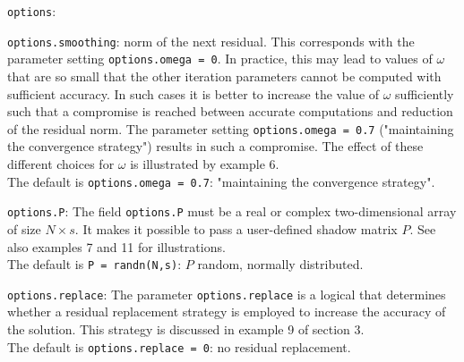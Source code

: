 \documentclass[prodmode,acmtoms]{acmsmall}
\begin{document}
\begin{describe}{{\tt options}:}
\begin{describe}{{\tt options.smoothing}:}
norm of the next residual. This corresponds with the parameter setting {\tt options.omega = 0}. In practice, this may lead to values of $\omega$ that are so small that the other iteration parameters cannot be computed with 
sufficient accuracy. In such cases it is better to increase the value  
of $\omega$ sufficiently such that a compromise is reached between accurate computations and reduction of the 
residual norm. The parameter setting {\tt options.omega = 0.7} ("maintaining the convergence strategy") results 
in  such a compromise. The effect of these different choices for $\omega$ is illustrated by example 6.\\
The default is {\tt options.omega = 0.7}: "maintaining the convergence strategy".
\item[{\tt options.P}:] The field {\tt options.P} must be a real or complex two-dimensional array of size 
$N \times s$. It makes it possible to pass a user-defined shadow matrix $P$. See also examples 7 and 11 for 
illustrations.\\
The default is {\tt P = randn(N,s)}: $P$ random, normally distributed.
\item[{\tt options.replace}:] The parameter {\tt options.replace} is a logical that determines whether a residual replacement strategy is employed
to increase the accuracy of the solution. This strategy is discussed in example 9 of section 3.\\
The default is {\tt options.replace = 0}: no residual replacement.
\end{describe}
\end{describe}
\end{document}
